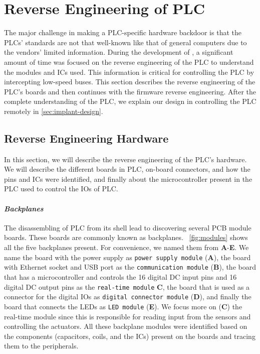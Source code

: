 \section{Reverse Engineering of PLC}
\label{sec:implant-design}

The major challenge in making a PLC-specific hardware backdoor is that the PLCs' standards are not that well-known like that of general computers due to the vendors' limited information. During the development of \name, a significant amount of time was focused on the reverse engineering of the PLC to understand the modules and ICs used. This information is critical for controlling the PLC by intercepting low-speed buses. This section describes the reverse engineering of the PLC's boards and then continues with the firmware reverse engineering. After the complete understanding of the PLC, we explain our design in controlling the PLC remotely in \autoref{sec:implant-design}.


\subsection{Reverse Engineering Hardware}

In this section, we will describe the reverse engineering of the PLC's hardware. We will describe the different boards in PLC, on-board connectors, and how the pins and ICs were identified, and finally about the microcontroller present in the PLC used to control the IOs of PLC.

\paragraph{\textbf{\textit{Backplanes}}} The disassembling of PLC from its shell lead to discovering several PCB module boards. These boards are commonly known as backplanes. ~\autoref{fig:modules} shows all the five backplanes present. For convenience, we named them from \textbf{A}-\textbf{E}. We name the board with the power supply as \texttt{power supply module} (\textbf{A}), the board with Ethernet socket and USB port as the \texttt{communication module} (\textbf{B}), the board that has a microcontroller and controls the 16 digital DC input pins and 16 digital DC output pins as the \texttt{real-time module} {\textbf{C}}, the board that is used as a connector for the digital IOs as \texttt{digital connector module} (\textbf{D}), and finally the board that connects the LEDs as \texttt{LED module} (\textbf{E}). We focus more on (\textbf{C}) the real-time module since this is responsible for reading input from the sensors and controlling the actuators. All these backplane modules were identified based on the components (capacitors, coils, and the ICs) present on the boards and tracing them to the peripherals. 

